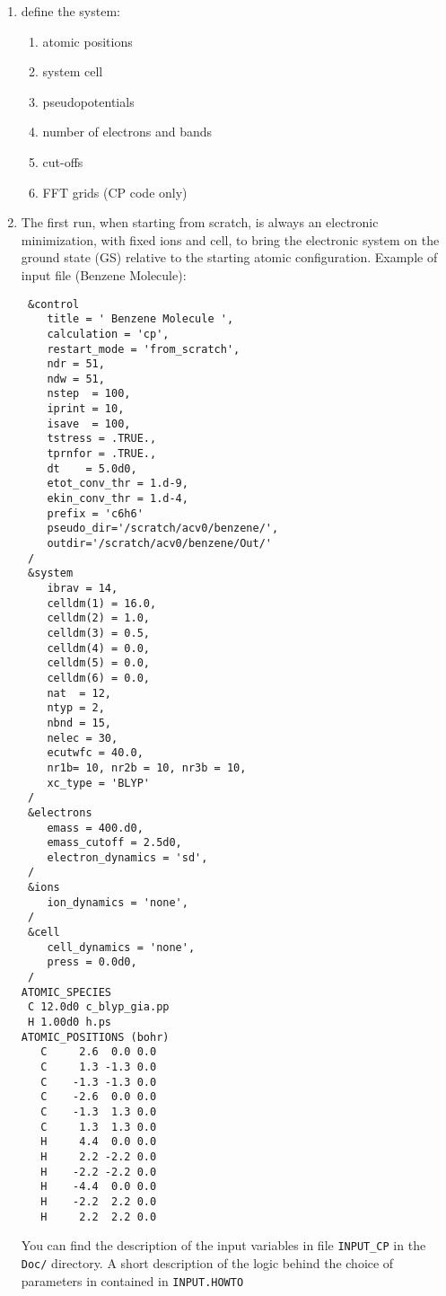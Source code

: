 \documentclass[12pt,a4paper]{article}
\begin{document}
\begin{enumerate}
  \item
    define the system:
    \begin{enumerate}
      \item atomic positions
      \item system cell
      \item pseudopotentials
      \item number of electrons and bands
      \item cut-offs 
      \item FFT grids (CP code only)
    \end{enumerate}

  \item
    The first run, when starting from scratch, is always an electronic
    minimization, with fixed ions and cell, to bring the electronic
    system on the ground state (GS) relative to the starting atomic
    configuration.
    Example of input file (Benzene Molecule):
\begin{verbatim}
 &control
    title = ' Benzene Molecule ',
    calculation = 'cp',
    restart_mode = 'from_scratch',
    ndr = 51,
    ndw = 51,
    nstep  = 100,
    iprint = 10, 
    isave  = 100,
    tstress = .TRUE.,
    tprnfor = .TRUE.,
    dt    = 5.0d0,
    etot_conv_thr = 1.d-9,
    ekin_conv_thr = 1.d-4,
    prefix = 'c6h6'
    pseudo_dir='/scratch/acv0/benzene/',
    outdir='/scratch/acv0/benzene/Out/'
 /
 &system
    ibrav = 14, 
    celldm(1) = 16.0, 
    celldm(2) = 1.0, 
    celldm(3) = 0.5, 
    celldm(4) = 0.0, 
    celldm(5) = 0.0, 
    celldm(6) = 0.0, 
    nat  = 12,
    ntyp = 2,
    nbnd = 15,
    nelec = 30,
    ecutwfc = 40.0,
    nr1b= 10, nr2b = 10, nr3b = 10,
    xc_type = 'BLYP'
 /
 &electrons
    emass = 400.d0,
    emass_cutoff = 2.5d0,
    electron_dynamics = 'sd',
 /
 &ions
    ion_dynamics = 'none',
 /
 &cell
    cell_dynamics = 'none',
    press = 0.0d0,
 /
ATOMIC_SPECIES
 C 12.0d0 c_blyp_gia.pp
 H 1.00d0 h.ps
ATOMIC_POSITIONS (bohr)
   C     2.6  0.0 0.0
   C     1.3 -1.3 0.0
   C    -1.3 -1.3 0.0
   C    -2.6  0.0 0.0
   C    -1.3  1.3 0.0
   C     1.3  1.3 0.0
   H     4.4  0.0 0.0
   H     2.2 -2.2 0.0
   H    -2.2 -2.2 0.0
   H    -4.4  0.0 0.0
   H    -2.2  2.2 0.0
   H     2.2  2.2 0.0
\end{verbatim}

    You can find the description of the input variables in file
    \texttt{INPUT\_CP} in the \texttt{Doc/}
    directory. A short description of the logic behind the choice 
    of parameters in contained in \texttt{INPUT.HOWTO}


\end{enumerate}
\end{document}

